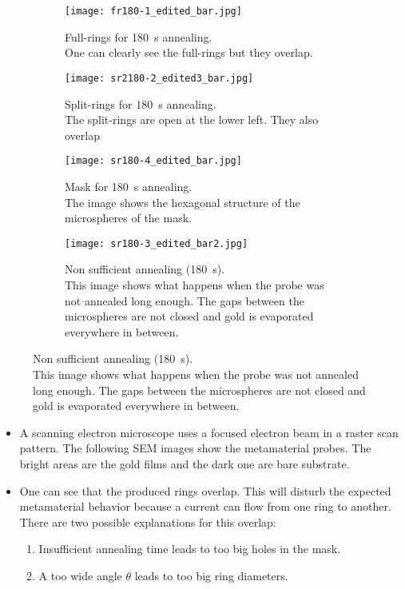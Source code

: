 \captionsetup{
    singlelinecheck=false,
    justification=justified
    }
\begin{figure}[htbp]
\begin{subfigure}[t][][t]{0.48\textwidth}
    \texttt{[image: fr180-1\_edited\_bar.jpg]}
    \caption[justification=raggedright]{
        Full-rings for \SI{180}{\second} annealing.\\
        One can clearly see the full-rings but they overlap.
        }
    \label{fig:sem-fr1}
\end{subfigure}
\hfill
\begin{subfigure}[t][][t]{0.48\textwidth}
    \texttt{[image: sr2180-2\_edited3\_bar.jpg]}
    \caption{
        Split-rings for \SI{180}{\second} annealing.\\
        The split-rings are open at the lower left.
        They also overlap
    }
    \label{fig:sem-sr1}
\end{subfigure}

\begin{subfigure}[t][][t]{0.48\textwidth}
    \texttt{[image: sr180-4\_edited\_bar.jpg]}
    \caption{
        Mask for \SI{180}{\second} annealing.\\
        The image shows the hexagonal structure of the microspheres of the mask.
    }
    \label{fig:sem-mask}
\end{subfigure}
\hfill
\begin{subfigure}[t][][t]{0.48\textwidth}
    \texttt{[image: sr180-3\_edited\_bar2.jpg]}
    \caption{
        Non sufficient annealing (\SI{180}{\second}).\\
        This image shows what happens when the probe was not annealed long enough.
        The gaps between the microspheres are not closed and gold is evaporated everywhere in between.
    }
    \label{fig:sem-nsa}
\end{subfigure}
\end{figure}
\begin{itemize}
    \item A scanning electron microscope uses a focused electron beam in a raster scan pattern.
    The following SEM images show the metamaterial probes.
    The bright areas are the gold films and the dark one are bare substrate.
    \item One can see that the produced rings overlap.
    This will disturb the expected metamaterial behavior because a current can flow from one ring to another.
    There are two possible explanations for this overlap:
    \begin{enumerate}
        \item Insufficient annealing time leads to too big holes in the mask.
        \item A too wide angle $\theta$ leads to too big ring diameters.
    \end{enumerate}
\end{itemize}




